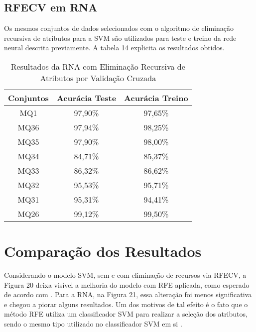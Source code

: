 \documentclass[12pt,oneside,a4paper,chapter=TITLE,section=TITLE,sumario=tradicional,english,brazil]{abntex2}
\begin{document}
\subsection{RFECV em RNA}
Os mesmos conjuntos de dados selecionados com o algoritmo de eliminação recursiva de atributos para a SVM são utilizados para teste e treino da rede neural descrita previamente. A tabela 14 explicita os resultados obtidos.\par
\begin{table}[h]
\centering
\caption{Resultados da RNA com Eliminação Recursiva de Atributos por Validação Cruzada}
\begin{tabular}{c|c|c}
\toprule
   Conjuntos &       Acurácia Teste &       Acurácia Treino \\
\midrule
 MQ1&	97,90\%&	97,65\%\\
MQ36&	97,94\%&	98,25\%\\
MQ35&	97,90\%&	98,00\%\\
MQ34&	84,71\%&	85,37\%\\
MQ33&	86,32\%&	86,62\%\\
MQ32&	95,53\%&	95,71\%\\
MQ31&	95,31\%&	94,41\%\\
MQ26&	99,12\%&	99,50\%\\
\bottomrule
\end{tabular}
\end{table}
\par
\section{Comparação dos Resultados}
Considerando o modelo SVM, sem e com eliminação de recursos via RFECV, a Figura 20 deixa visível a melhoria do modelo com RFE aplicada, como esperado de acordo com \cite{zhang2021}. Para a RNA, na Figura 21, essa alteração foi menos significativa e chegou a piorar alguns resultados. Um dos motivos de tal efeito é o fato que o método RFE utiliza um classificador SVM para realizar a seleção dos atributos, sendo o mesmo tipo utilizado no classificador SVM em si \cite{zhang2021}.\par
\end{document}
